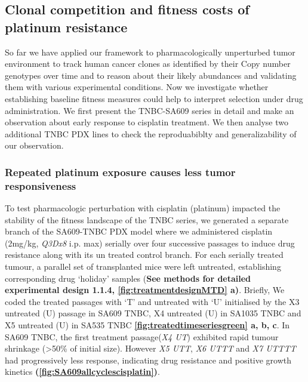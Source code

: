 \subsection{Clonal competition and fitness costs of platinum resistance}
So far we have applied our framework to pharmacologically unperturbed tumor environment to track human cancer clones as identified by their Copy number genotypes over time and to reason about their likely abundances and validating them with various experimental conditions. Now we investigate whether establishing baseline fitness measures could help to interpret selection under drug administration. We first present the TNBC-SA609 series in detail and make an observation about early response to cisplatin treatment. We then analyse two
additional TNBC PDX lines to check the reproduabiblty and generalizability of our observation.

\subsubsection{Repeated platinum exposure causes less tumor responsiveness} 
 To test pharmacologic perturbation with cisplatin (platinum) impacted the stability of the fitness landscape of the TNBC series, we generated a separate branch of the SA609-TNBC PDX model where we administered cisplatin (2mg/kg, \textit{Q3Dx8} i.p. max) serially over four successive passages to induce drug resistance along with its un treated control branch. For each serially treated tumour, a parallel set of transplanted mice were left untreated, establishing corresponding drug ‘holiday’ samples (\textbf{See methods for detailed experimental design \textbf{1.1.4}, \textbf{\autoref{fig:treatmentdesignMTD} a)}}. Briefly, We coded the treated passages with `T' and untreated with `U' initialised by the X3 untreated (U) passage in SA609 TNBC, X4 untreated (U) in SA1035 TNBC and X5 untreated (U) in SA535 TNBC \textbf{\autoref{fig:treatedtimeseriesgreen} a, b, c}. In SA609 TNBC, the first treatment passage(\textit{X4 UT}) exhibited rapid tumour shrinkage (>50\% of initial size). However \textit{X5 UTT}, \textit{X6 UTTT} and \textit{X7 UTTTT} had progressively less response, indicating drug resistance and positive growth kinetics \textbf{(\autoref{fig:SA609allcyclescisplatin})}. 


